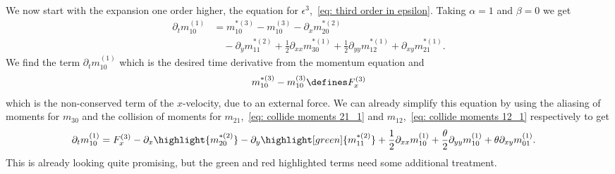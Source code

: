 We now start with the expansion one order higher, the equation for $\epsilon^3$,~\eqref{eq: third order in epsilon}.
Taking $\alpha=1$ and $\beta=0$ we get
\begin{equation}
  \label{eq: start of momentum equation derivation}
  \begin{aligned}
     \partial_t m_{10}^{(1)} & =
    m_{10}^{*(3)} - m_{10}^{(3)} - \partial_x m_{20}^{*(2)} \\
    &\quad - \partial_y m_{11}^{*(2)} + \frac{1}{2}\partial_{xx} m_{30}^{*(1)} + \frac{1}{2} \partial_{yy} m_{12}^{*(1)} + \partial_{xy} m_{21}^{*(1)}.
  \end{aligned}
\end{equation}
We find the term $\partial_t m_{10}^{(1)} $ which is the desired time derivative from the momentum equation and
\begin{equation}
  m_{10}^{*(3)} - m_{10}^{(3)}\defines F_x^{(3)}
\end{equation}
which is the non-conserved term of the $x$-velocity, due to an external force.
We can already simplify this equation by using the aliasing of moments for $m_{30}$ and the collision of moments for $m_{21}$,~\eqref{eq: collide moments 21_1} and $m_{12}$,~\eqref{eq: collide moments 12_1} respectively to get
\begin{equation}
  \label{eq: start of momentum equation derivation}
  \begin{aligned}
    \partial_t m_{10}^{(1)} & =
    F_x^{(3)} - \partial_x \highlight{m_{20}^{*(2)}} - \partial_y \highlight[green]{m_{11}^{*(2)}} + \frac{1}{2}\partial_{xx} m_{10}^{(1)} + \frac{\theta}{2} \partial_{yy} m_{10}^{(1)} + \theta\partial_{xy} m_{01}^{(1)}.
  \end{aligned}
\end{equation}
This is already looking quite promising, but the green and red highlighted terms need some additional treatment.
